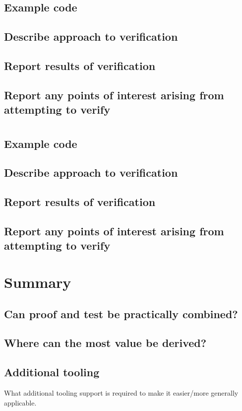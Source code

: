 \documentclass{llncs}
\begin{document}
\subsection{Example code}
\subsection{Describe approach to verification}
\subsection{Report results of verification}
\subsection{Report any points of interest arising from attempting to verify}

\section{}
\subsection{Example code}
\subsection{Describe approach to verification}
\subsection{Report results of verification}
\subsection{Report any points of interest arising from attempting to verify}

\section{Summary}

\subsection{Can proof and test be practically combined?}

\subsection{Where can the most value be derived?}

\subsection{Additional tooling}
What additional tooling support is required to make it easier/more
generally applicable.




\end{document}
